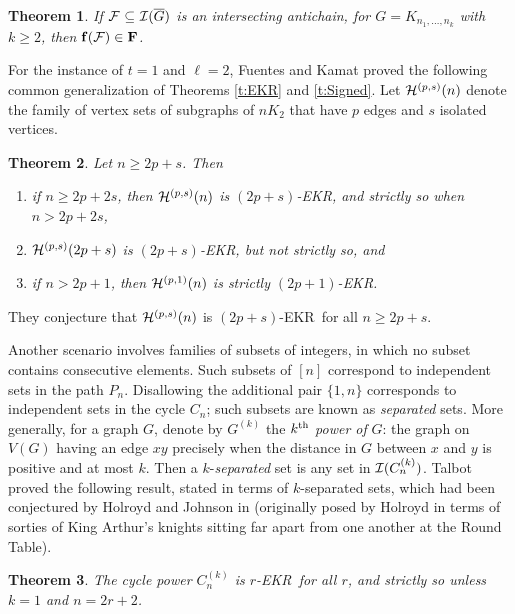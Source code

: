 \documentclass{article}
\newtheorem{thm}{Theorem}%
\def\bmf{{\mathbf{f}}}
\def\bmF{{\mathbf{F}}}
\def\cF{{\cal F}}
\def\cH{{\cal H}}
\def\cI{{\cal I}}
\def\oG{{\overline{G}}}
\def\ekr{{\sf EKR}}
\def\kth{{k^{\rm th}}}
\def\sse{{\subseteq}}
\begin{document}
\begin{thm}
\label{t:Bey}
If $\cF\ \sse\ \cI(\oG)$ is an intersecting antichain, for $G=K_{n_1,\ldots,n_k}$ with $k\ge 2$, then $\bmf(\cF)\in\bmF$.
\end{thm}

For the instance of $t=1$ and $\ell=2$, Fuentes and Kamat \cite{FuenKama} proved the following common generalization of Theorems \ref{t:EKR} and \ref{t:Signed}.
Let $\cH^{(p,s)}(n)$ denote the family of vertex sets of subgraphs of $nK_2$ that have $p$ edges and $s$ isolated vertices.

\begin{thm}
\label{t:FuenKama}
Let $n\ge 2p+s$.
Then
\begin{enumerate}
    \item 
    if $n\ge 2p+2s$, then $\cH^{(p,s)}(n)$ is $(2p+s)$-\ekr, and strictly so when $n>2p+2s$,
    \item 
    $\cH^{(p,s)}(2p+s)$ is $(2p+s)$-\ekr, but not strictly so, and
    \item 
    if $n>2p+1$, then $\cH^{(p,1)}(n)$ is strictly $(2p+1)$-\ekr.
\end{enumerate}
\end{thm}

They conjecture that $\cH^{(p,s)}(n)$ is $(2p+s)$-\ekr\ for all $n\ge 2p+s$.

Another scenario involves families of subsets of integers, in which no subset contains consecutive elements.
Such subsets of $[n]$ correspond to independent sets in the path $P_n$.
Disallowing the additional pair $\{1,n\}$ corresponds to independent sets in the cycle $C_n$; such subsets are known as {\it separated} sets.
More generally, for a graph $G$, denote by $G^{(k)}$ the $\kth$ {\it power of} $G$: the graph on $V(G)$ having an edge $xy$ precisely when the distance in $G$ between $x$ and $y$ is positive and at most $k$.
Then a $k$-{\it separated} set is any set in $\cI(C_n^{(k)})$.
Talbot \cite{Talbot} proved the following result, stated in terms of $k$-separated sets, which had been conjectured by Holroyd and Johnson in \cite{HolrJohn} (originally posed by Holroyd \cite{Holroyd} in terms of sorties of King Arthur's knights sitting far apart from one another at the Round Table).

\begin{thm}
\label{t:Cycles}
The cycle power $C_n^{(k)}$ is $r$-\ekr\ for all $r$, and strictly so unless $k=1$ and $n=2r+2$.
\end{thm}
\end{document}
